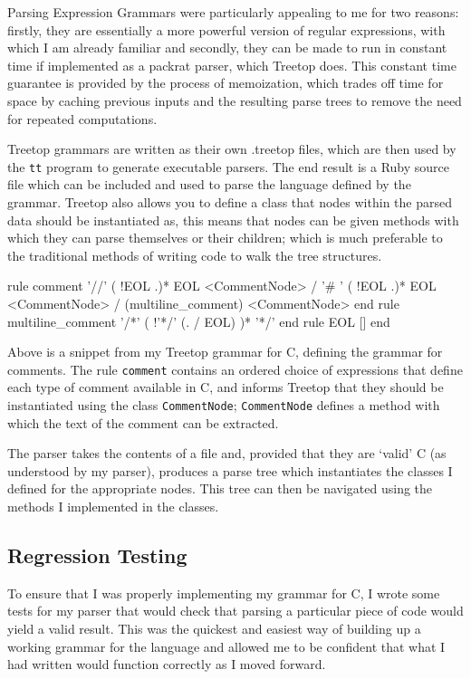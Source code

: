 Parsing Expression Grammars\cite{website:peg} were particularly appealing to me
for two reasons: firstly, they are essentially a more powerful version of
regular expressions, with which I am already familiar and secondly, they can be
made to run in constant time if implemented as a packrat parser, which Treetop
does. This constant time guarantee is provided by the process of memoization,
which trades off time for space by caching previous inputs and the resulting
parse trees to remove the need for repeated computations.

Treetop grammars are written as their own .treetop files, which are then used by
the \lstinline|tt| program to generate executable parsers. The end result is a
Ruby source file which can be included and used to parse the language defined by
the grammar. Treetop also allows you to define a class that nodes within the
parsed data should be instantiated as, this means that nodes can be given
methods with which they can parse themselves or their children; which is much
preferable to the traditional methods of writing code to walk the tree
structures.

\begin{code}[language=treetop]
  rule comment
    '//' ( !EOL .)* EOL <CommentNode>
    / '# ' ( !EOL .)* EOL <CommentNode>
    / (multiline_comment) <CommentNode>
  end
  rule multiline_comment
    '/*'
    (
      !'*/'
      (. / EOL)
    )*
    '*/'
  end
  rule EOL
    [\n]
  end
\end{code}

Above is a snippet from my Treetop grammar for C, defining the grammar for
comments. The rule \lstinline|comment| contains an ordered choice of expressions
that define each type of comment available in C, and informs Treetop that they
should be instantiated using the class \lstinline|CommentNode|;
\lstinline|CommentNode| defines a method with which the text of the comment
can be extracted.

The parser takes the contents of a file and, provided that they are `valid' C
(as understood by my parser), produces a parse tree which instantiates the
classes I defined for the appropriate nodes. This tree can then be navigated
using the methods I implemented in the classes.

  \subsection{Regression Testing}
    To ensure that I was properly implementing my grammar for C, I wrote some
    tests for my parser that would check that parsing a particular piece of code
    would yield a valid result. This was the quickest and easiest way of
    building up a working grammar for the language and allowed me to be
    confident that what I had written would function correctly as I moved
    forward.

